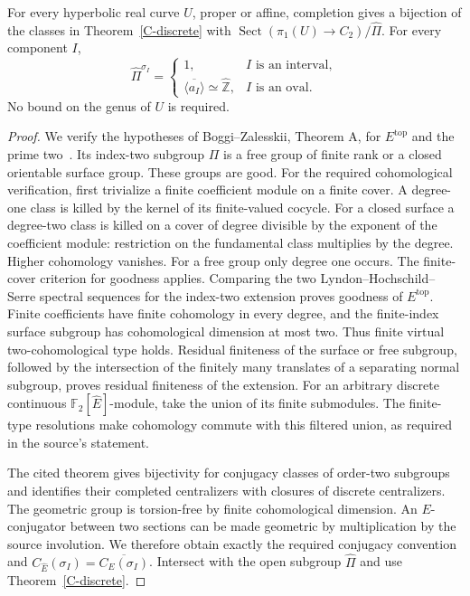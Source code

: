 \begin{theorem}
\label{C-profinite-centralizer}
For every hyperbolic real curve $U$, proper or affine,
completion gives a bijection of the classes in
Theorem~\ref{C-discrete} with
$\operatorname{Sect}(\pi_1(U)\to C_2)/\widehat\Pi$.
For every component $I$,
\[
 \widehat\Pi^{\sigma_I}=
 \begin{cases}
  1,&I\text{ is an interval},\\
  \overline{\langle a_I\rangle}\simeq\widehat{\mathbb Z},
       &I\text{ is an oval}.
 \end{cases}
\]
No bound on the genus of $U$ is required.
\end{theorem}
\begin{proof}
We verify the hypotheses of Boggi--Zalesskii, Theorem A,
for $E^{\mathrm{top}}$ and the prime two~\cite{BoggiZalesskii2024}.
Its index-two subgroup $\Pi$ is a free group of finite rank
or a closed orientable surface group. These groups are good.
For the required cohomological verification, first trivialize
a finite coefficient module on a finite cover. A degree-one
class is killed by the kernel of its finite-valued cocycle.
For a closed surface a degree-two class is killed on a cover
of degree divisible by the exponent of the coefficient
module: restriction on the fundamental class multiplies
by the degree. Higher cohomology vanishes. For a free
group only degree one occurs. The finite-cover criterion
for goodness applies. Comparing the two
Lyndon--Hochschild--Serre spectral sequences for the
index-two extension proves goodness of $E^{\mathrm{top}}$.
Finite coefficients have finite cohomology in every degree,
and the finite-index surface subgroup has cohomological
dimension at most two. Thus finite virtual
two-cohomological type holds.
Residual finiteness of the surface or free subgroup,
followed by the intersection of the finitely many
translates of a separating normal subgroup, proves
residual finiteness of the extension. For an arbitrary
discrete continuous $\mathbb F_2[\widehat E]$-module,
take the union of its finite submodules. The finite-type
resolutions make cohomology commute with this filtered
union, as required in the source's statement.

The cited theorem gives bijectivity for conjugacy classes
of order-two subgroups and identifies their completed
centralizers with closures of discrete centralizers.
The geometric group is torsion-free by finite
cohomological dimension. An $E$-conjugator between
two sections can be made geometric by multiplication
by the source involution. We therefore obtain exactly
the required conjugacy convention and
$C_{\widehat E}(\sigma_I)=\overline{C_E(\sigma_I)}$.
Intersect with the open subgroup $\widehat\Pi$ and use
Theorem~\ref{C-discrete}.


\end{proof}
